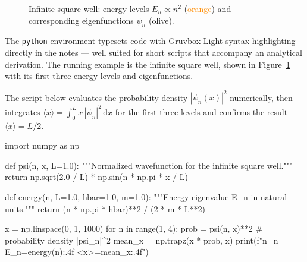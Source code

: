 \documentclass[a4paper,11pt]{article}
\begin{document}
\begin{figure}[H]
  \centering
  \caption{Infinite square well: energy levels $E_n \propto n^2$
           (\textcolor{darkorange}{orange}) and corresponding
           eigenfunctions $\psi_n$ (\textcolor{darkolive}{olive}).}
  \label{fig:well}
\end{figure}

The \verb|python| environment typesets code with Gruvbox Light
syntax highlighting directly in the notes — well suited for short
scripts that accompany an analytical derivation. The running example
is the infinite square well, shown in Figure~\ref{fig:well} with its
first three energy levels and eigenfunctions.

The script below evaluates the probability density
$|\psi_n(x)|^2$ numerically,
then integrates $\langle x \rangle = \int_0^L x\,|\psi_n|^2\,\mathrm{d}x$
for the first three levels and confirms the result $\langle x \rangle = L/2$.

\begin{python}
import numpy as np

def psi(n, x, L=1.0):
    """Normalized wavefunction for the infinite square well."""
    return np.sqrt(2.0 / L) * np.sin(n * np.pi * x / L)

def energy(n, L=1.0, hbar=1.0, m=1.0):
    """Energy eigenvalue E_n in natural units."""
    return (n * np.pi * hbar)**2 / (2 * m * L**2)

x = np.linspace(0, 1, 1000)
for n in range(1, 4):
    prob = psi(n, x)**2          # probability density |psi_n|^2
    mean_x = np.trapz(x * prob, x)
    print(f"n={n}  E_n={energy(n):.4f}  <x>={mean_x:.4f}")
\end{python}
\end{document}
